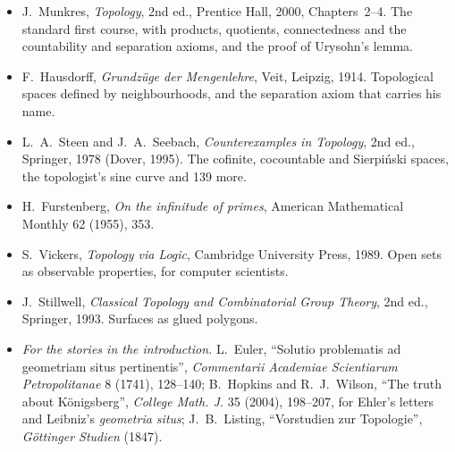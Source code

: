 \begin{itemize}
\item J.~Munkres, \emph{Topology}, 2nd ed., Prentice Hall, 2000, Chapters~2--4. The standard first course, with products, quotients,
connectedness and the countability and separation axioms, and the proof of Urysohn's lemma.
\item F.~Hausdorff, \emph{Grundz\"uge der Mengenlehre}, Veit, Leipzig, 1914. Topological spaces defined by neighbourhoods, and the
separation axiom that carries his name.
\item L.~A.~Steen and J.~A.~Seebach, \emph{Counterexamples in Topology}, 2nd ed., Springer, 1978 (Dover, 1995). The cofinite,
cocountable and Sierpi\'nski spaces, the topologist's sine curve and 139 more.
\item H.~Furstenberg, \emph{On the infinitude of primes}, American Mathematical Monthly 62 (1955), 353.
\item S.~Vickers, \emph{Topology via Logic}, Cambridge University Press, 1989. Open sets as observable properties, for computer
scientists.
\item J.~Stillwell, \emph{Classical Topology and Combinatorial Group Theory}, 2nd ed., Springer, 1993. Surfaces as glued polygons.
\item \emph{For the stories in the introduction.} L.~Euler, ``Solutio problematis ad geometriam situs pertinentis'', \emph{Commentarii Academiae Scientiarum Petropolitanae} 8 (1741),
128--140; B.~Hopkins and R.~J.~Wilson, ``The truth about K\"onigsberg'', \emph{College Math. J.} 35 (2004), 198--207, for Ehler's letters and Leibniz's \emph{geometria situs}; J.~B.~Listing,
``Vorstudien zur Topologie'', \emph{G\"ottinger Studien} (1847).
\end{itemize}
